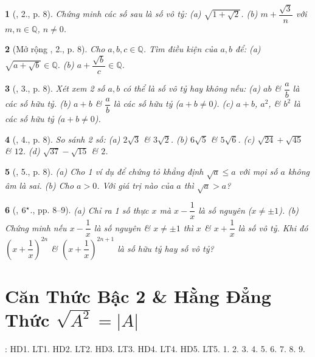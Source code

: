 \documentclass{article}
\newtheorem{baitoan}{}%
\begin{document}
\begin{baitoan}[\cite{Binh_Toan_9_tap_1}, 2., p. 8]
	Chứng minh các số sau là số vô tỷ: (a) $\sqrt{1 + \sqrt{2}}$. (b) $m + \dfrac{\sqrt{3}}{n}$ với $m,n\in\mathbb{Q}$, $n\ne0$.
\end{baitoan}

\begin{baitoan}[Mở rộng \cite{Binh_Toan_9_tap_1}, 2., p. 8]
	Cho $a,b,c\in\mathbb{Q}$. Tìm điều kiện của $a,b$ để: (a) $\sqrt{a + \sqrt{b}}\in\mathbb{Q}$. (b) $a + \dfrac{\sqrt{b}}{c}\in\mathbb{Q}$.
\end{baitoan}

\begin{baitoan}[\cite{Binh_Toan_9_tap_1}, 3., p. 8]
	Xét xem 2 số $a,b$ có thể là số vô tỷ hay không nếu: (a) $ab$ \& $\dfrac{a}{b}$ là các số hữu tỷ. (b) $a + b$ \& $\dfrac{a}{b}$ là các số hữu tỷ ($a + b\ne0$). (c) $a + b$, $a^2$, \& $b^2$ là các số hữu tỷ ($a + b\ne0$).
\end{baitoan}

\begin{baitoan}[\cite{Binh_Toan_9_tap_1}, 4., p. 8]
	So sánh 2 số: (a) $2\sqrt{3}$ \& $3\sqrt{2}$. (b) $6\sqrt{5}$ \& $5\sqrt{6}$. (c) $\sqrt{24} + \sqrt{45}$ \& $12$. (d) $\sqrt{37} - \sqrt{15}$ \& $2$.
\end{baitoan}

\begin{baitoan}[\cite{Binh_Toan_9_tap_1}, 5., p. 8]
	(a) Cho 1 ví dụ để chứng tỏ khẳng định $\sqrt{a}\le a$ với mọi số $a$ không âm là sai. (b) Cho $a > 0$. Với giá trị nào của $a$ thì $\sqrt{a} > a$?
\end{baitoan}

\begin{baitoan}[\cite{Binh_Toan_9_tap_1}, $\rm6^\star$., pp. 8--9]
	(a) Chỉ ra 1 số thực $x$ mà $x - \dfrac{1}{x}$ là số nguyên ($x\ne\pm1$). (b) Chứng minh nếu $x - \dfrac{1}{x}$ là số nguyên \& $x\ne\pm1$ thì $x$ \& $x + \dfrac{1}{x}$ là số vô tỷ. Khi đó $\left(x + \dfrac{1}{x}\right)^{2n}$ \& $\left(x + \dfrac{1}{x}\right)^{2n+1}$ là số hữu tỷ hay số vô tỷ?
\end{baitoan}


\section{Căn Thức Bậc 2 \& Hằng Đẳng Thức $\sqrt{A^2} = |A|$}
\cite[Chap. III, \S2, pp. 55--60]{SGK_Toan_9_Canh_Dieu_tap_1}: HD1. LT1. HD2. LT2. HD3. LT3. HD4. LT4. HD5. LT5. 1. 2. 3. 4. 5. 6. 7. 8. 9.
\end{document}
